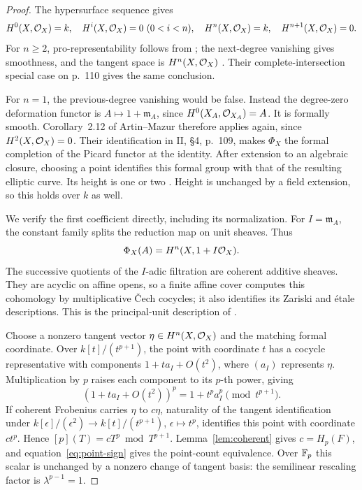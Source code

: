 \begin{proof}
The hypersurface sequence gives
\[
 H^0(X,\OO_X)=k,\quad H^i(X,\OO_X)=0\ (0<i<n),\quad
 H^n(X,\OO_X)=k,\quad H^{n+1}(X,\OO_X)=0.
\]
For $n\ge2$, pro-representability follows from
\citet[II, Corollary~4.2, p.~109]{fg-artin-mazur}; the next-degree
vanishing gives smoothness, and the tangent space is $H^n(X,\mathcal O_X)$
\citep[II, Corollaries~2.4--2.5 and~2.11--2.12,
pp.~106--107]{fg-artin-mazur}. Their complete-intersection special case
on p.~110 gives the same conclusion.

For $n=1$, the previous-degree vanishing would be false. Instead the
degree-zero deformation functor is $A\mapsto1+\mathfrak m_A$, since
$H^0(X_A,\mathcal O_{X_A})=A$. It is formally smooth. Corollary~2.12 of
Artin--Mazur therefore applies again, since $H^2(X,\mathcal O_X)=0$.
Their identification in II, \S4, p.~109, makes $\Phi_X$ the formal
completion of the Picard functor at the identity. After extension to an
algebraic closure, choosing a point identifies this formal group with
that of the resulting elliptic curve. Its height is one or two
\citep[IV, Theorem~7.4 and Corollary~7.5, p.~134]{fg-silverman}.
Height is unchanged by a field extension, so this holds over $k$ as well.

We verify the first coefficient directly, including its normalization.
For $I=\mathfrak m_A$, the constant family splits the reduction map on
unit sheaves. Thus
\[
 \Phi_X(A)=H^n(X,1+I\mathcal O_X).
\]
The successive quotients of the $I$-adic filtration are coherent additive
sheaves. They are acyclic on affine opens, so a finite affine cover
computes this cohomology by multiplicative \v Cech cocycles; it also
identifies its Zariski and \'etale descriptions. This is the
principal-unit description of \citet[II.(1.3)--(1.4), pp.~103--104,
and Corollary~2.6, p.~106]{fg-artin-mazur}.

Choose a nonzero tangent vector $\eta\in H^n(X,\mathcal O_X)$ and the matching
formal coordinate. Over $k[t]/(t^{p+1})$, the point with coordinate $t$
has a cocycle representative with components $1+t a_I+O(t^2)$, where
$(a_I)$ represents $\eta$. Multiplication by $p$ raises each component
to its $p$-th power, giving
\[
 (1+t a_I+O(t^2))^p=1+t^p a_I^p\pmod{t^{p+1}}.
\]
If coherent Frobenius carries $\eta$ to $c\eta$, naturality of the tangent
identification under $k[\epsilon]/(\epsilon^2)\to k[t]/(t^{p+1})$,
$\epsilon\mapsto t^p$, identifies this point with coordinate $ct^p$.
Hence $[p](T)=cT^p\bmod T^{p+1}$. Lemma~\ref{lem:coherent} gives
$c=H_p(F)$, and equation~\eqref{eq:point-sign} gives the point-count
equivalence. Over $\mathbb F_p$ this scalar is unchanged by a nonzero change of
tangent basis: the semilinear rescaling factor is $\lambda^{p-1}=1$.


\end{proof}
